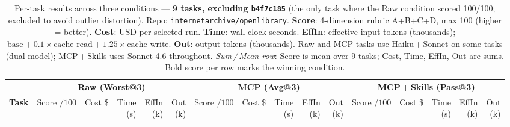 \documentclass[10pt]{article}
\begin{document}
\pagestyle{empty}

\begin{longtable}{@{}
    l
    | r r r r r
    | r r r r r
    | r r r r r
  @{}}

\caption{%
  Per-task results across three conditions — \textbf{9 tasks, excluding \texttt{b4f7c185}}
  (the only task where the Raw condition scored 100/100; excluded to avoid outlier distortion).
  Repo: \texttt{internetarchive/openlibrary}.
  \textbf{Score}: 4-dimension rubric A+B+C+D, max 100 (higher = better).
  \textbf{Cost}: USD per selected run.
  \textbf{Time}: wall-clock seconds.
  \textbf{EffIn}: effective input tokens (thousands);
  $\text{base} + 0.1{\times}\text{cache\_read} + 1.25{\times}\text{cache\_write}$.
  \textbf{Out}: output tokens (thousands).
  Raw and MCP tasks use Haiku\,+\,Sonnet on some tasks (dual-model);
  MCP\,+\,Skills uses Sonnet-4.6 throughout.
  \emph{Sum\,/\,Mean row}: Score is mean over 9 tasks; Cost, Time, EffIn, Out are sums.
  Bold score per row marks the winning condition.
}\label{tab:comparison-no-perfect}\\

\toprule
& \multicolumn{5}{c|}{\cellcolor{rawbg}\textbf{Raw (Worst@3)}}
& \multicolumn{5}{c|}{\cellcolor{mcpbg}\textbf{MCP (Avg@3)}}
& \multicolumn{5}{c}{\cellcolor{skillsbg}\textbf{MCP\,+\,Skills (Pass@3)}} \\
\cmidrule(lr){2-6}\cmidrule(lr){7-11}\cmidrule(lr){12-16}
\textbf{Task}
  & \makecell{Score\\$/100$} & \makecell{Cost\\\$} & \makecell{Time\\(s)} & \makecell{EffIn\\(k)} & \makecell{Out\\(k)}
  & \makecell{Score\\$/100$} & \makecell{Cost\\\$} & \makecell{Time\\(s)} & \makecell{EffIn\\(k)} & \makecell{Out\\(k)}
  & \makecell{Score\\$/100$} & \makecell{Cost\\\$} & \makecell{Time\\(s)} & \makecell{EffIn\\(k)} & \makecell{Out\\(k)} \\
\midrule
\endfirsthead


\end{longtable}
\end{document}
